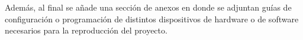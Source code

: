 Además, al final se añade una sección de anexos en donde se adjuntan guías de configuración o programación de distintos dispositivos de hardware o de software necesarios para la reproducción del proyecto.\\

